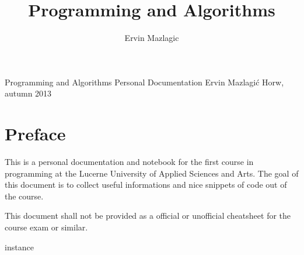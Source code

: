 \documentclass[a4paper,
               10pt,
               fleqn]{article}
\author{Ervin Mazlagic}
\title{Programming and Algorithms}
\begin{document}
	 {Programming and Algorithms}
         {Personal Documentation}
         {Ervin Mazlagi\'c}
         {Horw, autumn 2013}

\tableofcontents
\newpage

\section{Preface}
This is a personal documentation and notebook for the first course in 
programming at the Lucerne University of Applied Sciences and Arts.
The goal of this document is to collect useful informations and nice
snippets of code out of the course.

This document shall not be provided as a official or unofficial 
cheatsheet for the course exam or similar.

\gls{instance}




\begin{multicols}{2}

\glsaddall
\printglossaries

\end{multicols}
\end{document}
